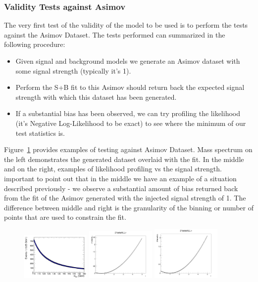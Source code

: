 \subsubsection{Validity Tests against Asimov}
The very first test of the validity of the model to be used is to perform the tests against the Asimov Dataset. The tests performed can summarized in the following procedure:

\begin{itemize}
    \item Given signal and background models we generate an Asimov dataset with some signal strength (typically it's 1).
    \item Perform the S+B fit to this Asimov should return back the expected signal strength with which this dataset has been generated.
    \item If a substantial bias has been observed, we can try profiling the likelihood (it's Negative Log-Likelihood to be exact) to see where the minimum of our test statistics is.
\end{itemize}

Figure~\ref{fig:higgs_analysis_asimovtests} provides examples of testing against Asimov Dataset. Mass spectrum on the left demonstrates the generated dataset overlaid with the fit. In the middle and on the right, examples of likelihood profiling vs the signal strength. important to point out that in the middle we have an example of a situation described previously - we observe a substantial amount of bias returned back from the fit of the Asimov generated with the injected signal strength of 1. The difference between middle and right is the granularity of the binning or number of points that are used to constrain the fit.

\begin{figure}[hbp]
     \centering
     \includegraphics[width=0.3\textwidth]{figures/ch_higgs/asimovtests/cat6_x_fit_b.png}
     \includegraphics[width=0.3\textwidth]{figures/ch_higgs/asimovtests/NLL_asimovTest_1GeV.png}
     \includegraphics[width=0.3\textwidth]{figures/ch_higgs/asimovtests/NLL_asimovTest_p25GeV.png}
     \caption{}
     \label{fig:higgs_analysis_asimovtests}
 \end{figure}

